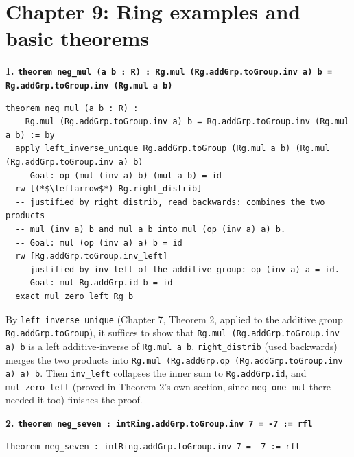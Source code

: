 \section{Chapter 9: Ring examples and basic theorems}\label{sec:14-appendix-solutions:08-chapter-9:1}

\textbf{1. \texttt{theorem neg\_\allowbreak{}mul (a b : R) : Rg.mul (Rg.addGrp.toGroup.inv a) b = Rg.addGrp.toGroup.inv (Rg.mul a b)}}

\begin{lstlisting}
theorem neg_mul (a b : R) :
    Rg.mul (Rg.addGrp.toGroup.inv a) b = Rg.addGrp.toGroup.inv (Rg.mul a b) := by
  apply left_inverse_unique Rg.addGrp.toGroup (Rg.mul a b) (Rg.mul (Rg.addGrp.toGroup.inv a) b)
  -- Goal: op (mul (inv a) b) (mul a b) = id
  rw [(*$\leftarrow$*) Rg.right_distrib]
  -- justified by right_distrib, read backwards: combines the two products
  -- mul (inv a) b and mul a b into mul (op (inv a) a) b.
  -- Goal: mul (op (inv a) a) b = id
  rw [Rg.addGrp.toGroup.inv_left]
  -- justified by inv_left of the additive group: op (inv a) a = id.
  -- Goal: mul Rg.addGrp.id b = id
  exact mul_zero_left Rg b
\end{lstlisting}

By \texttt{left\_\allowbreak{}inverse\_\allowbreak{}unique} (Chapter 7, Theorem 2, applied to the additive group \texttt{Rg.addGrp.toGroup}), it suffices to show that \texttt{Rg.mul (Rg.addGrp.toGroup.inv a) b} is a left additive-inverse of \texttt{Rg.mul a b}. \texttt{right\_\allowbreak{}distrib} (used backwards) merges the two products into \texttt{Rg.mul (Rg.addGrp.op (Rg.addGrp.toGroup.inv a) a) b}. Then \texttt{inv\_\allowbreak{}left} collapses the inner sum to \texttt{Rg.addGrp.id}, and \texttt{mul\_\allowbreak{}zero\_\allowbreak{}left} (proved in Theorem 2's own section, since \texttt{neg\_\allowbreak{}one\_\allowbreak{}mul} there needed it too) finishes the proof.

\textbf{2. \texttt{theorem neg\_\allowbreak{}seven : intRing.addGrp.toGroup.inv 7 = -\allowbreak{}7 := rfl}}

\begin{lstlisting}
theorem neg_seven : intRing.addGrp.toGroup.inv 7 = -7 := rfl
\end{lstlisting}

